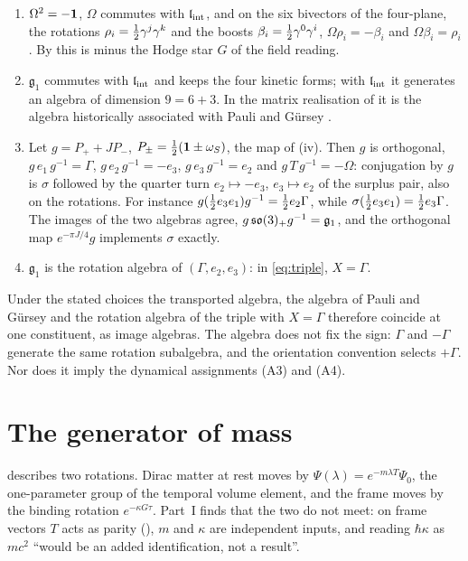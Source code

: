 \begin{theorem}
\label{thm:conjugation}
\begin{enumerate}[label=(\roman*),leftmargin=2.2em,itemsep=1pt]
\item $\Omega^2=-\mathbf 1$, $\Omega$ commutes with $\mathfrak l_{\rm int}$, and on the six bivectors of the four-plane, the rotations $\rho_i=\tfrac12\gamma^j\gamma^k$
and the boosts $\beta_i=\tfrac12\gamma^0\gamma^i$, $\Omega\rho_i=-\beta_i$ and $\Omega\beta_i=\rho_i$. By  this is minus the Hodge
star $G$ of the field reading.
\item $\mathfrak g_1$ commutes with $\mathfrak l_{\rm int}$ and keeps the four kinetic forms; with $\mathfrak l_{\rm int}$ it generates an algebra of dimension $9=6+3$. In
the matrix realisation of  it is the algebra historically associated with Pauli and G\"ursey \cite{Pauli57,Gursey58}.
\item Let $g=P_++JP_-$, $P_\pm=\tfrac12(\mathbf 1\pm\omega_S)$, the map of (iv). Then $g$ is orthogonal, $g\,e_1\,g^{-1}=\Gamma$,
$g\,e_2\,g^{-1}=-e_3$, $g\,e_3\,g^{-1}=e_2$ and $g\,T\,g^{-1}=-\Omega$: conjugation by $g$ is $\sigma$ followed by the quarter turn
$e_2\mapsto-e_3$, $e_3\mapsto e_2$ of the surplus pair, also on the rotations. For instance $g(\tfrac12 e_3e_1)g^{-1}=\tfrac12 e_2\Gamma$, while
$\sigma(\tfrac12 e_3e_1)=\tfrac12 e_3\Gamma$. The images of the two algebras agree, $g\,\mathfrak{so}(3)_+g^{-1}=\mathfrak g_1$, and the orthogonal map
$e^{-\pi J/4}g$ implements $\sigma$ exactly.
\item $\mathfrak g_1$ is the rotation algebra of $(\Gamma,e_2,e_3)$: in \cref{eq:triple}, $X=\Gamma$.
\end{enumerate}
\end{theorem}

Under the stated choices the transported algebra, the algebra of Pauli and G\"ursey and the rotation algebra of the triple with $X=\Gamma$
therefore coincide at one constituent, as image algebras. The algebra does not fix the sign: $\Gamma$ and $-\Gamma$ generate the same rotation
subalgebra, and the orientation convention selects $+\Gamma$. Nor does it imply the dynamical assignments (A3) and (A4).

\section{The generator of mass}

 describes two rotations. Dirac matter at rest moves by $\Psi(\lambda)=e^{-m\lambda T}\Psi_0$, the one-parameter group of
the temporal volume element, and the frame moves by the binding rotation $e^{-\kappa G\tau}$. Part~I finds that the two do not meet: on frame
vectors $T$ acts as parity (), $m$ and $\kappa$ are independent inputs, and reading $\hbar\kappa$ as $mc^2$ ``would be an
added identification, not a result''.

